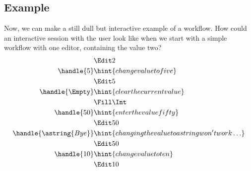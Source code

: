 \subsection{Example}

Now, we can make a still dull but interactive example of a workflow.
How could an interactive session with the user look like when we start with a simple workflow with one editor,
containing the value two?
\begin{align*}
    & \Edit 2 \\
  \handle{5} & \hint{change value to five} \\
    & \Edit 5 \\
  \handle{\Empty} & \hint{clear the current value} \\
    & \Fill \Int \\
  \handle{50} & \hint{enter the value fifty} \\
    & \Edit 50 \\
  \handle{\astring{Bye}} & \hint{changing the value to a string won't work\ldots} \\
    & \Edit 50 \\
  \handle{10} & \hint{change value to ten} \\
    & \Edit 10
\end{align*}
